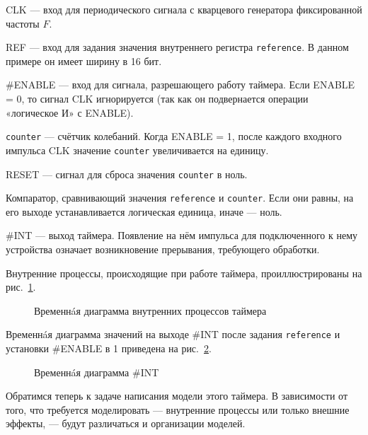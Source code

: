 \begin{itemize*}
    \item CLK --- вход для периодического сигнала с кварцевого генератора фиксированной частоты $F$. %
    \item REF --- вход для задания значения внутреннего регистра \texttt{reference}. В данном примере он имеет ширину в 16 бит.
    \item \#ENABLE --- вход для сигнала, разрешающего работу таймера. Если ENABLE = 0, то сигнал CLK игнорируется (так как он подвернается операции «логическое И» с ENABLE).
    \item \texttt{counter} --- счётчик колебаний. Когда ENABLE = 1, после каждого входного импульса CLK значение \texttt{counter} увеличивается на единицу.
    \item RESET --- сигнал для сброса значения \texttt{counter} в ноль.
    \item Компаратор, сравнивающий значения \texttt{reference} и \texttt{counter}. Если они равны, на его выходе устанавливается логическая единица, иначе --- ноль.
    \item \#INT --- выход таймера. Появление на нём импульса для подключенного к нему устройства означает возникновение прерывания, требующего обработки.
\end{itemize*}

Внутренние процессы, происходящие при работе таймера, проиллюстрированы на рис. \ref{fig:counter-diagram}.

\begin{figure}[htp]
    \centering
    \caption[Временнáя диаграмма внутренних процессов]{Временнáя диаграмма внутренних процессов таймера}
    \label{fig:counter-diagram}
\end{figure}

Временнáя диаграмма значений на выходе \#INT после задания \texttt{reference} и установки \#ENABLE в 1 приведена на рис.~\ref{fig:timer-diagram}.

\begin{figure}[htp]
    \centering
    \caption[Временнáя диаграмма \#INT]{Временнáя диаграмма \#INT}
    \label{fig:timer-diagram}
\end{figure}

Обратимся теперь к задаче написания модели этого таймера. В зависимости от того, что требуется моделировать — внутренние процессы или только внешние эффекты, — будут различаться и организации моделей.


